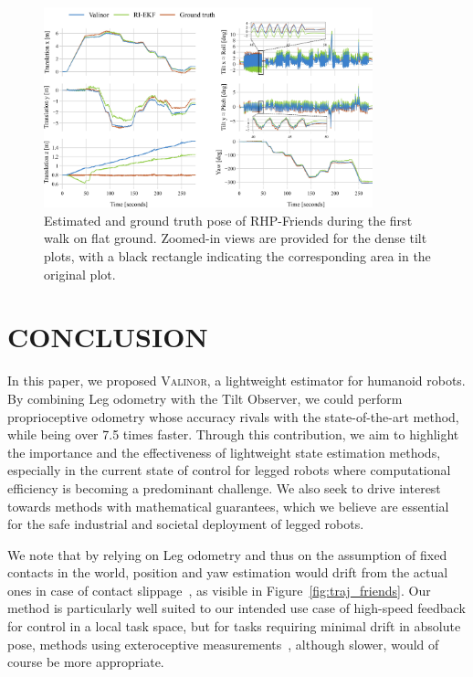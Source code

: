 \documentclass{IJCAS}
\begin{document}
\begin{figure}[]
\begin{center}
\includegraphics[width=0.85\textwidth]{pose.jpg} 
\vskip -0.5pc
\caption{Estimated and ground truth pose of RHP-Friends during the first walk on flat ground. Zoomed-in views are provided for the dense tilt plots, with a black rectangle indicating the corresponding area in the original plot.}\label{fig:pose_rhps1}
\end{center}
\vskip -1.5pc
\end{figure}


\section{CONCLUSION}

In this paper, we proposed {\scshape Valinor}, a lightweight estimator for humanoid robots. By combining Leg odometry with the Tilt Observer, we could perform proprioceptive odometry whose accuracy rivals with the state-of-the-art method, while being over 7.5 times faster. Through this contribution, we aim to highlight the importance and the effectiveness of lightweight state estimation methods, especially in the current state of control for legged robots where computational efficiency is becoming a predominant challenge. We also seek to drive interest towards methods with mathematical guarantees, which we believe are essential for the safe industrial and societal deployment of legged robots. 

We note that by relying on Leg odometry and thus on the assumption of fixed contacts in the world, position and yaw estimation would drift from the actual ones in case of contact slippage~\cite{bloesch2013FusionLegKineAndImu}, as visible in Figure~\ref{fig:traj_friends}. Our method is particularly well suited to our intended use case of high-speed feedback for control in a local task space, but for tasks requiring minimal drift in absolute pose, methods using exteroceptive measurements~\cite{wisth2022vilens, Kuang2024TightlyCoupledLidarImuUwb}, although slower, would of course be more appropriate.
\end{document}
